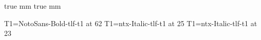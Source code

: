 %
%
%


%
 true mm%
 true mm%
%

%
\makeatletter%
%
\cmap T1\font\lxiisf=NotoSans-Bold-tlf-t1 at 62\Unit%
\cmap T1\font\xxvit=ntx-Italic-tlf-t1 at 25\Unit%
\cmap T1\font\xxiiiit=ntx-Italic-tlf-t1 at 23\Unit%
%
\let\@orig@normal\normal%
\def\normal{%
  \@orig@normal%
  \abovedisplayskip 10\Unit%
  \belowdisplayskip \abovedisplayskip%
  \abovedisplayshortskip \ZeroUnit%
  \belowdisplayshortskip 6\Unit%
}%
\let\@orig@small\small%
\def\small{%
  \@orig@small%
  \abovedisplayskip 8.5\Unit%
  \belowdisplayskip \abovedisplayskip%
  \abovedisplayshortskip \ZeroUnit%
  \belowdisplayshortskip 4\Unit%
}%
%
\def\MathNotes{Math Notes}%
%
\newif\ifcover \coverfalse%
\def\CoverOrTitle{%
  \ifcover\covermatter\fi%
  \startproperpage%
  \ifcover\thispagelabel{cover}\fi%
  \begingroup%
    \fullpage%
    \textbox\Zero{%
      
      \lxiisf\@title%
    }%
    \dimen\Zero \hsize%
    \advance \dimen\Zero -\wd\Zero%
    \dimen\One \FontQuadWidth\lxiisf%
    \vbox to \vsize{%
      \ifcover%
        \setcolor cmyk(.5, .5, 0, 0);%
        \rlap{\vrule width \hsize height \vsize depth \ZeroUnit}%
        \kern -.75\vsize%
      \else%
        \hrule width \ZeroUnit height \ZeroUnit depth \ZeroUnit%
        \kern .25\vsize%
      \fi%
      \moveright .5\dimen\Zero \vbox{%
        \ifcover\setcolor gray(1);\fi%
        \hrule width \wd\Zero height 1.6\Unit depth \ZeroUnit%
        \kern 5.6\Unit%
        \hrule width \wd\Zero height 4.8\Unit depth \ZeroUnit%
        \kern .125\dimen\One%
        \copy\Zero%
        \kern 2\dp\Zero%
        \kern .125\dimen\One%
        \hrule width \wd\Zero height 4.8\Unit depth \ZeroUnit%
        \kern 5.6\Unit%
        \hrule width \wd\Zero height 1.6\Unit depth \ZeroUnit%
        \kern .125\dimen\One%
        \hbox to \wd\Zero{%
          
          \hss\xxvit from \@subject%
        }%
        \ifcover\resetcolor\fi%
      }%
      \vfill%
      \ifcover\else%
        \moveright .25\dimen\Zero \vbox{%
          \dimen\Zero .5\dimen\Zero%
          \advance \dimen\Zero \wd\Zero%
          \hrule width \dimen\Zero height 1.6\Unit depth \ZeroUnit%
          \kern .125\dimen\One%
          \hbox to \dimen\Zero{%
            
            \hss\xxiiiit\@author\hss%
          }%
          \kern .05\vsize%
        }%
      \fi%
      \ifcover\resetcolor\fi%
    }%
    \eject%
  \endgroup%
  \ifcover\global\blankpagelabeltrue\fi%
}%
